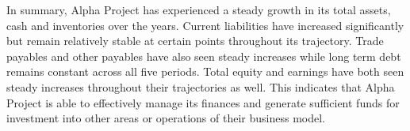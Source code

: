  

In summary, Alpha Project has experienced a steady growth in its total assets, cash and inventories over the years. Current liabilities have increased significantly but remain relatively stable at certain points throughout its trajectory. Trade payables and other payables have also seen steady increases while long term debt remains constant across all five periods. Total equity and earnings have both seen steady increases throughout their trajectories as well. This indicates that Alpha Project is able to effectively manage its finances and generate sufficient funds for investment into other areas or operations of their business model.
